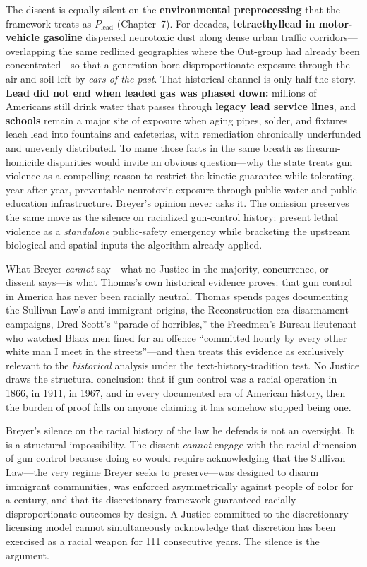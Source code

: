 \documentclass[12pt,openany]{book}
\begin{document}
The dissent is equally silent on the \textbf{environmental preprocessing} that the framework treats as $P_{\text{lead}}$ (Chapter~7). For decades, \textbf{tetraethyllead in motor-vehicle gasoline} dispersed neurotoxic dust along dense urban traffic corridors---overlapping the same redlined geographies where the Out-group had already been concentrated---so that a generation bore disproportionate exposure through the air and soil left by \textit{cars of the past}. That historical channel is only half the story. \textbf{Lead did not end when leaded gas was phased down:} millions of Americans still drink water that passes through \textbf{legacy lead service lines}, and \textbf{schools} remain a major site of exposure when aging pipes, solder, and fixtures leach lead into fountains and cafeterias, with remediation chronically underfunded and unevenly distributed. To name those facts in the same breath as firearm-homicide disparities would invite an obvious question---why the state treats gun violence as a compelling reason to restrict the kinetic guarantee while tolerating, year after year, preventable neurotoxic exposure through public water and public education infrastructure. Breyer's opinion never asks it. The omission preserves the same move as the silence on racialized gun-control history: present lethal violence as a \textit{standalone} public-safety emergency while bracketing the upstream biological and spatial inputs the algorithm already applied.

What Breyer \textit{cannot} say---what no Justice in the majority, concurrence, or dissent says---is what Thomas's own historical evidence proves: that gun control in America has never been racially neutral. Thomas spends pages documenting the Sullivan Law's anti-immigrant origins, the Reconstruction-era disarmament campaigns, Dred Scott's ``parade of horribles,'' the Freedmen's Bureau lieutenant who watched Black men fined for an offence ``committed hourly by every other white man I meet in the streets''---and then treats this evidence as exclusively relevant to the \textit{historical} analysis under the text-history-tradition test. No Justice draws the structural conclusion: that if gun control was a racial operation in 1866, in 1911, in 1967, and in every documented era of American history, then the burden of proof falls on anyone claiming it has somehow stopped being one.

Breyer's silence on the racial history of the law he defends is not an oversight. It is a structural impossibility. The dissent \textit{cannot} engage with the racial dimension of gun control because doing so would require acknowledging that the Sullivan Law---the very regime Breyer seeks to preserve---was designed to disarm immigrant communities, was enforced asymmetrically against people of color for a century, and that its discretionary framework guaranteed racially disproportionate outcomes by design. A Justice committed to the discretionary licensing model cannot simultaneously acknowledge that discretion has been exercised as a racial weapon for 111 consecutive years. The silence is the argument.
\end{document}
